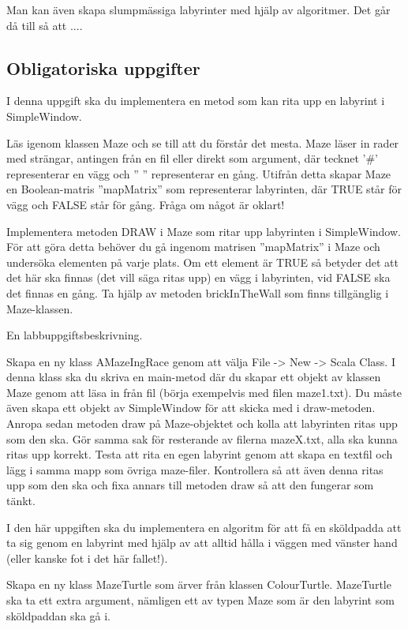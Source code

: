 Man kan även skapa slumpmässiga labyrinter med hjälp av algoritmer. Det går då till så att ....


\subsection{Obligatoriska uppgifter}

\Task I denna uppgift ska du implementera en metod som kan rita upp en labyrint i SimpleWindow.

\Subtask Läs igenom klassen Maze och se till att du förstår det mesta. Maze läser in rader med strängar, antingen från en fil eller direkt som argument, där tecknet '\#' representerar en vägg och '' '' representerar en gång. Utifrån detta skapar Maze en Boolean-matris ''mapMatrix'' som representerar labyrinten, där TRUE står för vägg och FALSE står för gång. Fråga om något är oklart!

\Subtask Implementera metoden DRAW i Maze som ritar upp labyrinten i SimpleWindow. För att göra detta behöver du gå ingenom matrisen ''mapMatrix'' i Maze och undersöka elementen på varje plats. Om ett element är TRUE så betyder det att det här ska finnas (det vill säga ritas upp) en vägg i labyrinten, vid FALSE ska det finnas en gång. Ta hjälp av metoden brickInTheWall som finns tillgänglig i Maze-klassen.

\Task En labbuppgiftsbeskrivning.

\Subtask Skapa en ny klass AMazeIngRace genom att välja File -> New -> Scala Class. I denna klass ska du skriva en main-metod där du skapar ett objekt av klassen Maze genom att läsa in från fil (börja exempelvis med filen maze1.txt). Du måste även skapa ett objekt av SimpleWindow för att skicka med i draw-metoden. Anropa sedan metoden draw på Maze-objektet och kolla att labyrinten ritas upp som den ska. Gör samma sak för resterande av filerna mazeX.txt, alla ska kunna ritas upp korrekt. Testa att rita en egen labyrint genom att skapa en textfil och lägg i samma mapp som övriga maze-filer. Kontrollera så att även denna ritas upp som den ska och fixa annars till metoden draw så att den fungerar som tänkt.

\Task I den här uppgiften ska du implementera en algoritm för att få en sköldpadda att ta sig genom en labyrint med hjälp av att alltid hålla i väggen med vänster hand (eller kanske fot i det här fallet!).

\Subtask Skapa en ny klass MazeTurtle som ärver från klassen ColourTurtle. MazeTurtle ska ta ett extra argument, nämligen ett av typen Maze som är den labyrint som sköldpaddan ska gå i.

